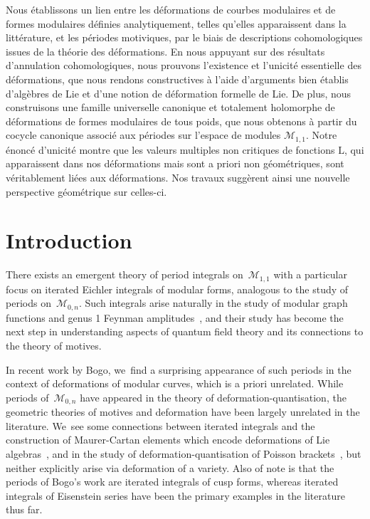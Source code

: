 \documentclass[JEP,XML,SOM,Unicode,published]{cedram}
\theoremstyle{plain}
\theoremstyle{definition}
\newcommand{\cM}{\ensuremath{\mathcal{M}}}
\begin{document}

\begin{altabstract}
Nous établissons un lien entre les déformations de courbes modulaires et de formes modulaires définies analytiquement, telles qu'elles apparaissent dans la littérature, et les périodes motiviques, par le biais de descriptions cohomologiques issues de la théorie des déformations. En nous appuyant sur des résultats d'annulation cohomologiques, nous prouvons l'existence et l'unicité essentielle des déformations, que nous rendons constructives à l'aide d'arguments bien établis d'algèbres de Lie et d'une notion de déformation formelle de Lie. De plus, nous construisons une famille universelle canonique et totalement holomorphe de déformations de formes modulaires de tous poids, que nous obtenons à partir du cocycle canonique associé aux périodes sur l'espace de modules $\mathcal{M}_{1,1}$. Notre énoncé d'unicité montre que les valeurs multiples non critiques de fonctions $\mathrm{L}$, qui apparaissent dans nos déformations mais sont a priori non géométriques, sont véritablement liées aux déformations. Nos travaux suggèrent ainsi une nouvelle perspective géométrique sur celles-ci.
\end{altabstract}

\maketitle
\vspace*{-\baselineskip}
\tableofcontents
\mainmatter

\section*{Introduction}

There exists an emergent theory of period integrals on~$\cM_{1,1}$ with a particular focus on iterated Eichler integrals of modular forms, analogous to the study of periods on~$\cM_{0,n}$. Such integrals arise naturally in the study of modular graph functions and genus 1 Feynman amplitudes~\cite{broedel19, duhr23, tapuskovic23}, and their study has become the next step in understanding aspects of quantum field theory and its connections to the theory of motives.

In recent work by Bogo, we~find a surprising appearance of such periods in the context of deformations of modular curves, which is a priori unrelated. While periods of~$\cM_{0,n}$ have appeared in the theory of deformation-quantisation, the geometric theories of motives and deformation have been largely unrelated in the literature. We~see some connections between iterated integrals and the construction of Maurer-Cartan elements which encode deformations of Lie algebras~\cite{levin07,enriquez21}, and in the study of deformation-quantisation of Poisson brackets~\cite{banks20}, but neither explicitly arise via deformation of a variety. Also of note is that the periods of Bogo's work are iterated integrals of cusp forms, whereas iterated integrals of Eisenstein series have been the primary examples in the literature thus far.
\end{document}
